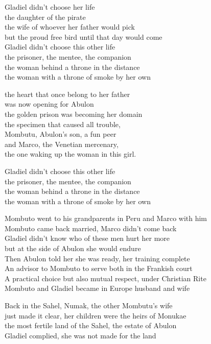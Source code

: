 \begin{lyrics}
Gladiel didn't choose her life\\
the daughter of the pirate\\
the wife of whoever her father would pick\\
but the proud free bird until that day would come\\
Gladiel didn't choose this other life\\
the prisoner, the mentee, the companion\\
the woman behind a throne in the distance\\
the woman with a throne of smoke by her own

the heart that once belong to her father\\
was now opening for Abulon\\
the golden prison was becoming her domain\\
the specimen that caused all trouble,\\
Mombutu, Abulon's son, a fun peer\\
and Marco, the Venetian mercenary,\\
the one waking up the woman in this girl.

Gladiel didn't choose this other life\\
the prisoner, the mentee, the companion\\
the woman behind a throne in the distance\\
the woman with a throne of smoke by her own

Mombuto went to his grandparents in Peru and Marco with him\\
Mombuto came back married, Marco didn't come back\\
Gladiel didn't know who of these men hurt her more\\
but at the side of Abulon she would endure\\
Then Abulon told her she was ready, her training complete\\
An advisor to Mombuto to serve both in the Frankish court\\
A practical choice but also mutual respect, under Christian Rite\\
Mombuto and Gladiel became in Europe husband and wife

Back in the Sahel, Numak, the other Mombutu's wife\\
just made it clear, her children were the heirs of Monukae\\
the most fertile land of the Sahel, the estate of Abulon\\
Gladiel complied, she was not made for the land


\end{lyrics}
